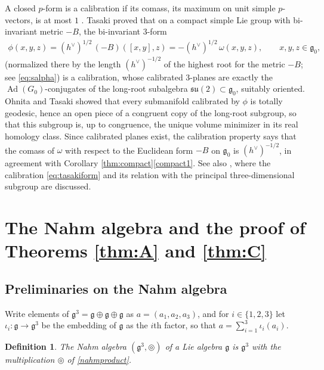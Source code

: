 \documentclass[leqno,10pt]{amsart}
\newtheorem{definition}[theorem]{Definition}%
\theoremstyle{definition}
\numberwithin{equation}{section}
\newcommand{\tmlt}{\circledcirc}
\newcommand{\om}{\omega}
\newcommand{\su}{\mathfrak{su}}
\newcommand{\g}{\mathfrak{g}}
\newcommand{\Ad}{\operatorname{Ad}}
\newcommand{\gz}{\g_{0}}
\newcommand{\hv}{h^\vee}
\begin{document}
\begin{remark}\label{rem:calibration}
A closed $p$-form is a calibration if its comass, its maximum on unit simple $p$-vectors, is at most $1$ \cite{Harvey-Lawson}. Tasaki \cite[Theorem~5]{Tasaki-calibration} proved that on a compact simple Lie group with bi-invariant metric $-B$, the bi-invariant $3$-form 
\begin{align}\label{eq:tasakiform}
\phi(x, y, z) = (\hv)^{1/2}\,(-B)([x, y], z) = -(\hv)^{1/2}\,\om(x, y, z), \qquad x, y, z \in \gz,
\end{align}
(normalized there by the length $(\hv)^{-1/2}$ of the highest root for the metric $-B$; see \eqref{eq:salpha}) is a calibration, whose calibrated $3$-planes are exactly the $\Ad(G_{0})$-conjugates of the long-root subalgebra $\su(2) \subset \gz$, suitably oriented. Ohnita and Tasaki \cite[Theorem~2 and Lemma~5]{Ohnita-Tasaki} showed that every submanifold calibrated by $\phi$ is totally geodesic, hence an open piece of a congruent copy of the long-root subgroup, so that this subgroup is, up to congruence, the unique volume minimizer in its real homology class. Since calibrated planes exist, the calibration property says that the comass of $\om$ with respect to the Euclidean form $-B$ on $\gz$ is $(\hv)^{-1/2}$, in agreement with Corollary \ref{thm:compact}\ref{compact1}. See also \cite{Hitchin-calibrations}, where the calibration \eqref{eq:tasakiform} and its relation with the principal three-dimensional subgroup are discussed.
\end{remark}

\section{The Nahm algebra and the proof of Theorems \ref{thm:A} and \ref{thm:C}}\label{sec:nahm}
\subsection{Preliminaries on the Nahm algebra}\label{sec:nahmprelim}
Write elements of $\g^{3} = \g \oplus \g \oplus \g$ as $a = (a_{1}, a_{2}, a_{3})$, and for $i \in \{1, 2, 3\}$ let $\iota_{i}:\g \to \g^{3}$ be the embedding of $\g$ as the $i$th factor, so that $a = \sum_{i=1}^{3}\iota_{i}(a_{i})$. 

\begin{definition}\label{def:nahm}
The \emph{Nahm algebra} $(\g^{3}, \tmlt)$ of a Lie algebra $\g$ is $\g^{3}$ with the multiplication $\tmlt$ of \eqref{nahmproduct}.
\end{definition}
\end{document}
